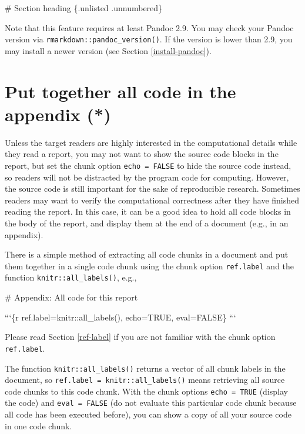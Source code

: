 \documentclass[
  11pt,
]{krantz}
\newenvironment{Shaded}{\begin{snugshade}}{\end{snugshade}}
\newcommand{\BaseNTok}[1]{\textcolor[rgb]{0.06,0.06,0.06}{#1}}
\newcommand{\FunctionTok}[1]{\textcolor[rgb]{0,0,0}{#1}}
\begin{document}
\begin{Shaded}
\begin{Highlighting}[]
\FunctionTok{# Section heading \{.unlisted .unnumbered\}}
\end{Highlighting}
\end{Shaded}

Note that this feature requires at least Pandoc 2.9. You may check your Pandoc version via \texttt{rmarkdown::pandoc\_version()}. If the version is lower than 2.9, you may install a newer version (see Section \ref{install-pandoc}).

\hypertarget{code-appendix}{%
\section{Put together all code in the appendix (*)}\label{code-appendix}}

Unless the target readers are highly interested in the computational details while they read a report, you may not want to show the source code blocks in the report, but set the chunk option \texttt{echo\ =\ FALSE} to hide the source code instead, so readers will not be distracted by the program code for computing. However, the source code is still important for the sake of reproducible research. Sometimes readers may want to verify the computational correctness after they have finished reading the report. In this case, it can be a good idea to hold all code blocks in the body of the report, and display them at the end of a document (e.g., in an appendix).

There is a simple method of extracting all code chunks in a document and put them together in a single code chunk using the chunk option \texttt{ref.label} and the function \texttt{knitr::all\_labels()}, e.g.,

\begin{Shaded}
\begin{Highlighting}[]
\FunctionTok{# Appendix: All code for this report}

\BaseNTok{```\{r ref.label=knitr::all_labels(), echo=TRUE, eval=FALSE\}}
\BaseNTok{```}
\end{Highlighting}
\end{Shaded}

Please read Section \ref{ref-label} if you are not familiar with the chunk option \texttt{ref.label}.

The function \texttt{knitr::all\_labels()} returns a vector of all chunk labels in the document, so \texttt{ref.label\ =\ knitr::all\_labels()} means retrieving all source code chunks to this code chunk. With the chunk options \texttt{echo\ =\ TRUE} (display the code) and \texttt{eval\ =\ FALSE} (do not evaluate this particular code chunk because all code has been executed before), you can show a copy of all your source code in one code chunk.
\end{document}

